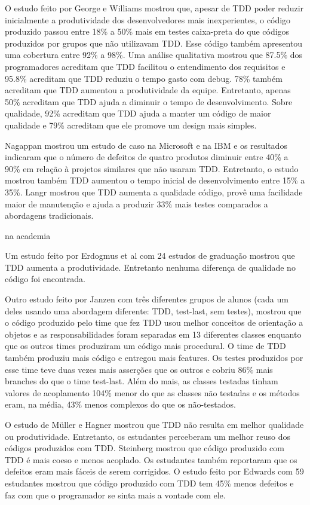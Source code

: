 O estudo feito por George e Williams \cite{george-e-williams} mostrou que,
apesar de TDD poder reduzir inicialmente a produtividade dos desenvolvedores 
mais inexperientes, o código produzido passou entre 18\% a 50\% mais em testes 
caixa-preta do que códigos produzidos por grupos que não utilizavam TDD. Esse
código também apresentou uma cobertura entre 92\% a 98\%. Uma análise
qualitativa mostrou que 87.5\% dos programadores acreditam que TDD facilitou o 
entendimento dos requisitos e 95.8\% acreditam que TDD reduziu o tempo gasto com debug. 78\%
também acreditam que TDD aumentou a produtividade da equipe. Entretanto, apenas 
50\% acreditam que TDD ajuda a diminuir o tempo de desenvolvimento. Sobre
qualidade, 92\% acreditam que TDD ajuda a manter um código de maior qualidade e 
79\% acreditam que ele promove um design mais simples.

Nagappan \cite{nagappan-ms} mostrou um estudo de caso na Microsoft e na IBM e os
resultados indicaram que o número de defeitos de quatro produtos diminuir entre 
40\% a 90\% em relação à projetos similares que não usaram TDD. Entretanto, o 
estudo mostrou também TDD aumentou o tempo inicial de desenvolvimento entre 15\%
a 35\%. Langr \cite{langr} mostrou que TDD aumenta a qualidade código, provê uma 
facilidade maior de manutenção e ajuda a produzir 33\% mais testes comparados  a
abordagens tradicionais.

na academia


Um estudo feito por Erdogmus et al \cite{erdogmus-morisio} com 24 estudos de
graduação mostrou que TDD aumenta a produtividade. Entretanto nenhuma diferença 
de qualidade no código foi encontrada.

Outro estudo feito por Janzen \cite{janzen-saiedian} com três diferentes grupos
de alunos (cada um deles usando uma abordagem diferente: TDD, test-last, sem
testes), mostrou que o código produzido pelo time que fez TDD usou melhor
conceitos  de orientação a objetos e as responsabilidades foram separadas em 13 
diferentes classes enquanto que os outros times produziram um código mais
procedural. O time de TDD também produziu mais código e entregou mais features.
Os testes produzidos por esse time teve duas vezes mais asserções que os outros 
e cobriu 86\% mais branches do que o time test-last. Além do mais, as classes 
testadas tinham valores de acoplamento 104\% menor do que as classes não
testadas e os métodos eram, na média, 43\% menos complexos do que os
não-testados.

O estudo de Müller e Hagner \cite{muller-e-hagner} mostrou que TDD não resulta
em melhor qualidade ou produtividade. Entretanto, os estudantes perceberam um 
melhor reuso dos códigos produzidos com TDD. Steinberg \cite{steinberg} mostrou
que código produzido com TDD é mais coeso e menos acoplado. Os estudantes também
reportaram que os defeitos eram mais fáceis de serem corrigidos. O estudo feito
por Edwards \cite{edwards} com  59 estudantes mostrou que código produzido com
TDD tem 45\% menos defeitos e faz com que o programador se sinta mais a vontade
com ele.

